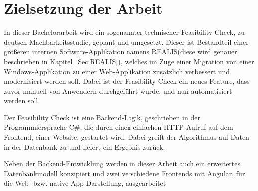 \section{Zielsetzung der Arbeit}
In dieser Bachelorarbeit wird ein sogenannter technischer Feasibility Check, zu deutsch Machbarkeitsstudie, geplant und umgesetzt. Dieser ist Bestandteil einer größeren internen Software-Applikation namens \ac{REALIS}(diese wird genauer beschrieben in Kapitel~\ref{Sec:REALIS}), welches
im Zuge einer Migration  von einer Windows-Applikation zu einer Web-Applikation zusätzlich verbessert und modernisiert werden soll. Dabei ist der Feasibility Check ein neues Feature, dass zuvor manuell von Anwendern durchgeführt wurde, und nun automatisiert werden soll.

Der Feasibility Check ist eine Backend-Logik, geschrieben in der Programmiersprache C\#, die durch einen einfachen HTTP-Aufruf auf dem Frontend, einer Website, gestartet wird. Dabei greift der Algorithmus auf Daten in der Datenbank zu und liefert ein Ergebnis zurück.

Neben der Backend-Entwicklung werden in dieser Arbeit auch ein erweitertes Datenbankmodell konzipiert und zwei verschiedene Frontends mit Angular, für die Web- bzw. native App Darstellung, ausgearbeitet 